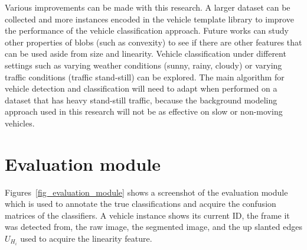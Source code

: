 \documentclass[conference]{IEEEtran}
\begin{document}
Various improvements can be made with this research. A larger dataset can be collected and more instances encoded in the vehicle template library to improve the performance of the vehicle classification approach. Future works can study other properties of blobs (such as convexity) to see if there are other features that can be used aside from size and linearity. Vehicle classification under different settings such as varying weather conditions (sunny, rainy, cloudy) or varying traffic conditions (traffic stand-still) can be explored. The main algorithm for vehicle detection and classification will need to adapt when performed on a dataset that has heavy stand-still traffic, because the background modeling approach used in this research will not be as effective on slow or non-moving vehicles. 

\appendices
\section{Evaluation module}

Figures~\ref{fig_evaluation_module} shows a screenshot of the evaluation module which is used to annotate the true classifications and acquire the confusion matrices of the classifiers. A vehicle instance shows its current ID, the frame it was detected from, the raw image, the segmented image, and the up slanted edges $U_{H_i}$ used to acquire the linearity feature.
\end{document}
